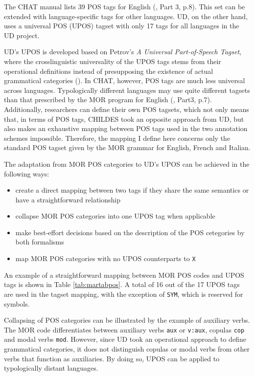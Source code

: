 The CHAT manual lists 39 POS tags for English (\cite{Macwhinney2000}, Part 3, p.8). This set can be extended with language-specific tags for other languages. UD, on the other hand, uses a universal POS (UPOS) tagset with only 17 tags for all languages in the UD project.

UD's UPOS is developed based on Petrov's \emph{A Universal Part-of-Speech Tagset}, where the crosslinguistic universality of the UPOS tags stems from their operational definitions instead of presupposing the existence of actual grammatical categories (\cite{petrov2012}). In CHAT, however, POS tags are much less universal across languages. Typologically different languages may use quite different tagsets than that prescribed by the MOR program for English (\cite{Macwhinney2000}, Part3, p.7). Additionally, researchers can define their own POS tagsets, which not only means that, in terms of POS tags, CHILDES took an opposite approach from UD, but also makes an exhaustive mapping between POS tags used in the two annotation schemes impossible. Therefore, the mapping I define here concerns only the standard POS tagset given by the MOR grammar for English, French and Italian.

The adaptation from MOR POS categories to UD's UPOS can be achieved in the following ways:
\begin{itemize}
	\item create a direct mapping between two tags if they share the same semantics or have a straightforward relationship
	\item collapse MOR POS categories into one UPOS tag when applicable
	\item make best-effort decisions based on the description of the POS cetegories by both formalisms
	\item map MOR POS categories with no UPOS counterparts to \texttt{X}
\end{itemize}

An example of a straightforward mapping between MOR POS codes and UPOS tags is shown in Table \ref{tab:martabpos}. A total of 16 out of the 17 UPOS tags are used in the tagset mapping, with the exception of \texttt{SYM}, which is reserved for symbols.

Collapsing of POS categories can be illustrated by the example of auxiliary verbs. The MOR code differentiates between auxiliary verbs \texttt{aux} or \texttt{v:aux}, copulas \texttt{cop} and modal verbs \texttt{mod}. However, since UD took an operational approach to define grammatical categories, it does not distinguish copulas or modal verbs from other verbs that function as auxiliaries. By doing so, UPOS can be applied to typologically distant languages.

